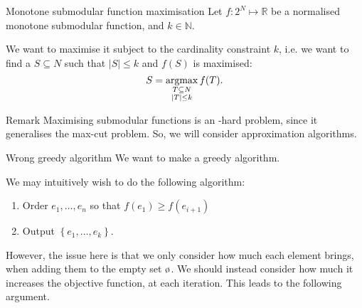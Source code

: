 \documentclass[a4paper]{article}
\begin{document}
\begin{parag}{Monotone submodular function maximisation}
    Let $f: 2^N \mapsto \mathbb{R}$ be a normalised monotone submodular function, and $k \in \mathbb{N}$.  

    We want to maximise it subject to the cardinality constraint $k$, i.e. we want to find a $S \subseteq N$ such that $\left|S\right| \leq k$ and $f\left(S\right)$ is maximised: 
    \[S = \argmax_{\substack{T \subseteq N \\ \left|T\right| \leq k}} f\left(T\right).\]

    \begin{subparag}{Remark}
        Maximising submodular functions is an -hard problem, since it generalises the max-cut problem. So, we will consider approximation algorithms.
    \end{subparag}
\end{parag}


\begin{parag}{Wrong greedy algorithm}
    We want to make a greedy algorithm.

    We may intuitively wish to do the following algorithm:
    \begin{enumerate}
        \item Order $e_1, \ldots, e_n$ so that $f\left(e_1\right) \geq f\left(e_{i+1}\right)$
        \item Output $\left\{e_1, \ldots, e_k\right\}$.
    \end{enumerate}

    However, the issue here is that we only consider how much each element brings, when adding them to the empty set $\o$. We should instead consider how much it increases the objective function, at each iteration. This leads to the following argument.
\end{parag}
\end{document}
